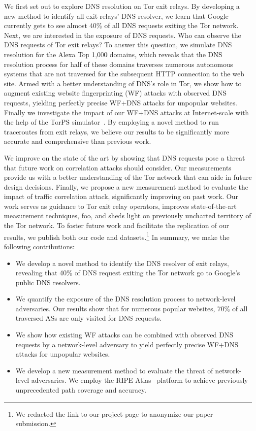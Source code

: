 We first set out to explore DNS resolution on Tor exit relays.  By developing a
new method to identify all exit relays' DNS resolver, we learn that Google
currently gets to see almost 40\% of all DNS requests exiting the Tor network.
Next, we are interested in the exposure of DNS requests.  Who can observe the
DNS requests of Tor exit relays?  To answer this question, we simulate DNS
resolution for the Alexa Top 1,000 domains, which reveals that the DNS
resolution process for half of these domains traverses numerous autonomous
systems that are not traversed for the subsequent HTTP connection to the web
site.  Armed with a better understanding of DNS's role in Tor, we show how to
augment existing website fingerprinting (WF) attacks with observed DNS requests,
yielding perfectly precise WF+DNS attacks for unpopular websites.
Finally we investigate the impact of our WF+DNS attacks at Internet-scale
with the help of the TorPS simulator~\cite{TorPS}.
By employing a novel method to run traceroutes from
exit relays, we believe our results to be significantly more accurate and
comprehensive than previous work.

We improve on the state of the art by showing that DNS requests pose a threat
that future work on correlation attacks should consider.  Our measurements
provide us with a better understanding of the Tor network that can aide in
future design decisions.  Finally, we propose a new measurement method to
evaluate the impact of traffic correlation attack, significantly improving on
past work.  Our work \first serves as guidance to Tor exit relay operators,
\second improves state-of-the-art measurement techniques, \third foo, \fourth
and sheds light on previously uncharted territory of the Tor network.  To
foster future work and facilitate the replication of our results, we publish
both our code and datasets.\footnote{We redacted the link to our project page to
anonymize our paper submission.} In summary, we make the following
contributions:
\begin{itemize}
	\item We develop a novel method to identify the DNS resolver of exit relays,
		revealing that 40\% of DNS request exiting the Tor network go to
		Google's public DNS resolvers.

	\item We quantify the exposure of the DNS resolution process to
		network-level adversaries.  Our results show that for numerous popular
		websites, 70\% of all traversed ASs are only visited for DNS requests.

	\item We show how existing WF attacks can be combined with observed DNS
	requests by a network-level adversary to yield perfectly precise
	WF+DNS attacks for unpopular websites. 

	\item We develop a new measurement method to evaluate the threat of
		network-level adversaries. We employ the RIPE Atlas~\cite{atlas}
		platform to achieve previously unprecedented path coverage and accuracy.
\end{itemize}

